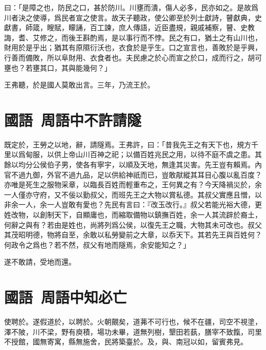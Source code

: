 曰：「是障之也，防民之口，甚於防川。川壅而潰，傷人必多，民亦如之。是故爲川者決之使導，爲民者宣之使言。故天子聽政，使公卿至於列士獻詩，瞽獻{典}，史獻書，師箴，瞍賦，矇誦，百工諫，庶人傳語，近臣盡規，親戚補察，瞽、史教誨，耆、艾修之，而後王斟酌焉，是以事行而不悖。民之有口，猶土之有山川也，財用於是乎出；猶其有原隰衍沃也，衣食於是乎生。口之宣言也，善敗於是乎興，行善而備敗，所以阜財用、衣食者也。夫民慮之於心而宣之於口，成而行之，胡可壅也？若壅其口，其與能幾何？」

王弗聽，於是國人莫敢出言。三年，乃流王於。

\section[襄王不許請隧\quad{\small 國語 周語中}]{{\normalsize 國語\ 周語中}\quad {}不許請隧}
既定於，王勞之以地，辭，請隧焉。王弗許，曰：「昔我先王之有天下也，規方千里以爲甸服，以供上帝山川百神之祀；以備百姓兆民之用，以待不庭不虞之患。其餘以均分公侯伯子男，使各有寧宇，以順及天地，無逢其災害。先王豈有賴焉。內官不過九御，外官不過九品，足以供給神祇而已，豈敢{猒}縱其耳目心腹以亂百度？亦唯是死生之服物采章，以臨長百姓而輕重布之，王何異之有？今天降禍災於，余一人僅亦守府，又不佞以勤叔父，而班先王之大物以賞私德。其叔父實應且憎，以非余一人，余一人豈敢有愛也？先民有言曰：『改玉改行。』叔父若能光裕大德，更姓改物，以創制天下，自顯庸也，而縮取備物以鎮撫百姓，余一人其流辟於裔土，何辭之與有？若由是姓也，尚將列爲公侯，以復先王之職，大物其未可改也。叔父其茂昭明德，物將自至，余敢以私勞變前之大章，以忝天下。其若先王與百姓何？何政令之爲也？若不然，叔父有地而隧焉，余安能知之？」

遂不敢請，受地而還。

\theendnotes

\section[單子知陳必亡\quad{\small 國語 周語中}]{{\normalsize 國語\ 周語中}\quad {}知必亡}
使聘於。遂假道於，以聘於。火朝覿矣，道茀不可行也，候不在疆，司空不視塗，澤不陂，川不梁，野有庾積，場功未畢，道無列樹，墾田若蓺，膳宰不致餼，司里不授館，國無寄寓，縣無施舍，民將築臺於。及，與、南冠以如，留賓弗見。

